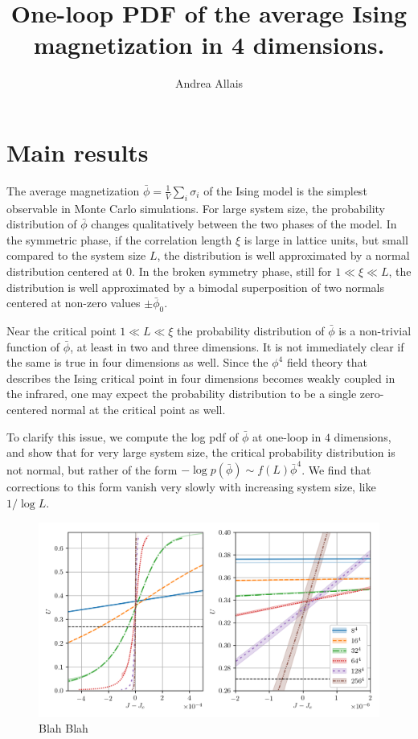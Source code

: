 \documentclass[11pt,a4paper]{article}
\title{One-loop PDF of the average Ising magnetization in 4 dimensions.}
\author{Andrea Allais}
\begin{document}
\maketitle

\section{Main results}

The average magnetization $\bar{\phi} = \frac{1}{V} \sum_{i} \sigma_i$ of the
Ising model is the simplest observable in Monte Carlo simulations. For large
system size, the probability distribution of $\bar{\phi}$ changes qualitatively
between the two phases of the model. In the symmetric phase, if the correlation
length $\xi$ is large in lattice units, but small compared to the system size
$L$, the distribution is well approximated by a normal distribution centered at
0. In the broken symmetry phase, still for $1 \ll \xi \ll L$, the distribution
is well approximated by a bimodal superposition of two normals centered at
non-zero values $\pm \bar{\phi}_0$. 

Near the critical point $1 \ll L \ll \xi$ the probability distribution of
$\bar{\phi}$ is a non-trivial function of $\bar{\phi}$, at least in two and
three dimensions.  It is not immediately clear if the same is true in four
dimensions as well.  Since the $\phi^4$ field theory that describes the Ising
critical point in four dimensions becomes weakly coupled in the infrared, one
may expect the probability distribution to be a single zero-centered normal at
the critical point as well.

To clarify this issue, we compute the log pdf of $\bar{\phi}$ at one-loop in
$4$ dimensions, and show that for very large system size, the critical
probability distribution is not normal, but rather of the form
$-\log p(\bar{\phi})\sim f(L) \bar{\phi}^4$. We find that corrections to this
form vanish very slowly with increasing system size, like $1/\log L$.

\begin{figure}
\begin{center}
\includegraphics[scale=0.75]{binder_cumulant.png}
\end{center}
\caption{\label{fig:binder_cumulant} Blah Blah}
\end{figure}
\end{document}
